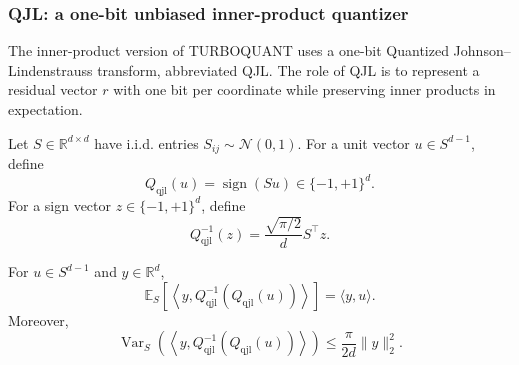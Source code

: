 \subsubsection*{QJL: a one-bit unbiased inner-product quantizer}

The inner-product version of TURBOQUANT uses a one-bit Quantized Johnson--Lindenstrauss transform, abbreviated QJL.
The role of QJL is to represent a residual vector $r$ with one bit per coordinate while preserving inner products in expectation.

Let $S\in\mathbb R^{d\times d}$ have i.i.d. entries $S_{ij}\sim\mathcal N(0,1)$.
For a unit vector $u\in S^{d-1}$, define
\begin{equation}
    Q_{\mathrm{qjl}}(u)=\operatorname{sign}(Su)\in\{-1,+1\}^{d}.
\end{equation}
For a sign vector $z\in\{-1,+1\}^d$, define
\begin{equation}
    Q_{\mathrm{qjl}}^{-1}(z)
    =\frac{\sqrt{\pi/2}}{d}S^\top z.
\end{equation}

\begin{lemma}
\label{lem:tq-qjl}
For $u\in S^{d-1}$ and $y\in\mathbb R^d$,
\begin{equation}
    \mathbb E_S\left[\left\langle y,Q_{\mathrm{qjl}}^{-1}(Q_{\mathrm{qjl}}(u))\right\rangle\right]
    =\langle y,u\rangle.
\end{equation}
Moreover,
\begin{equation}
    \operatorname{Var}_S\left(
    \left\langle y,Q_{\mathrm{qjl}}^{-1}(Q_{\mathrm{qjl}}(u))\right\rangle
    \right)
    \le \frac{\pi}{2d}\|y\|_2^2.
\end{equation}
\end{lemma}

